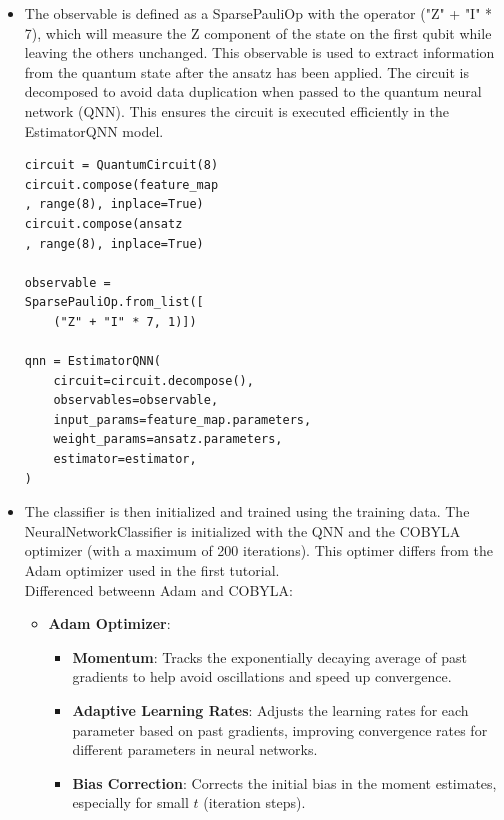 \documentclass[conference]{IEEEtran}
\begin{document}
\begin{itemize}
    \item The observable is defined as a SparsePauliOp \cite{qiskit_sparsepauliop} with the operator ("Z" + "I" * 7), which will measure the Z component of the state on the first qubit while leaving the others unchanged. This observable is used to extract information from the quantum state after the ansatz has been applied.
    The circuit is decomposed to avoid data duplication when passed to the quantum neural network (QNN). This ensures the circuit is executed efficiently in the EstimatorQNN \cite{qiskit_estimatorqnn} model.
    

    {\small
    \begin{verbatim}
circuit = QuantumCircuit(8)
circuit.compose(feature_map
, range(8), inplace=True)
circuit.compose(ansatz
, range(8), inplace=True)

observable = 
SparsePauliOp.from_list([
    ("Z" + "I" * 7, 1)])

qnn = EstimatorQNN(
    circuit=circuit.decompose(),
    observables=observable,
    input_params=feature_map.parameters,
    weight_params=ansatz.parameters,
    estimator=estimator,
)
    \end{verbatim}}


    \item The classifier is then initialized and trained using the training data.   
    The NeuralNetworkClassifier is initialized with the QNN and the COBYLA optimizer \cite{qiskit_cobyla} (with a maximum of 200 iterations). This optimer differs from the Adam optimizer used in the first tutorial.\\

    
    Differenced betweenn Adam and COBYLA:
    \begin{itemize}
        \item \textbf{Adam Optimizer}:
        \begin{itemize}
            \item \textbf{Momentum}: Tracks the exponentially decaying average of past gradients to help avoid oscillations and speed up convergence.
            \item \textbf{Adaptive Learning Rates}: Adjusts the learning rates for each parameter based on past gradients, improving convergence rates for different parameters in neural networks.
            \item \textbf{Bias Correction}: Corrects the initial bias in the moment estimates, especially for small $t$ (iteration steps).
        \end{itemize}
    

\end{itemize}
\end{itemize}
\end{document}
